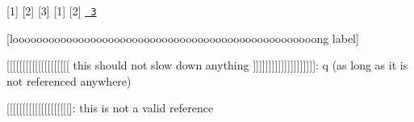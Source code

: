 \mbox{[}1\mbox{]} \mbox{[}2\mbox{]} \mbox{[}3\mbox{]} \mbox{[}1\mbox{]} \mbox{[}2\mbox{]} \href{http://foo/bar}{\texttt{ 3}}

\mbox{[}looooooooooooooooooooooooooooooooooooooooooooooooooong label\mbox{]}

\mbox{[}\mbox{[}\mbox{[}\mbox{[}\mbox{[}\mbox{[}\mbox{[}\mbox{[}\mbox{[}\mbox{[}\mbox{[}\mbox{[}\mbox{[}\mbox{[}\mbox{[}\mbox{[}\mbox{[}\mbox{[}\mbox{[}\mbox{[} this should not slow down anything \mbox{]}\mbox{]}\mbox{]}\mbox{]}\mbox{]}\mbox{]}\mbox{]}\mbox{]}\mbox{]}\mbox{]}\mbox{]}\mbox{]}\mbox{]}\mbox{]}\mbox{]}\mbox{]}\mbox{]}\mbox{]}\mbox{]}\mbox{]}\+: q (as long as it is not referenced anywhere)

\mbox{[}\mbox{[}\mbox{[}\mbox{[}\mbox{[}\mbox{[}\mbox{[}\mbox{[}\mbox{[}\mbox{[}\mbox{[}\mbox{[}\mbox{[}\mbox{[}\mbox{[}\mbox{[}\mbox{[}\mbox{[}\mbox{[}\mbox{[}\mbox{]}\+: this is not a valid reference 